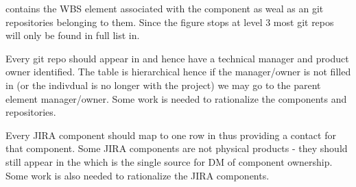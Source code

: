  contains the WBS element associated with the component as weal as an git repositories belonging to them.
 Since the figure stops at level 3 most git repos will only be found in full list in.

 Every git repo should appear in   and hence have a technical manager and product owner identified. The table is hierarchical hence if the manager/owner is not filled in (or the indivdual is no longer with the project) we may go to the parent element manager/owner. Some work is needed to rationalize the components and repositories.

 Every JIRA component should map to one row in  thus providing a contact for that component.
 Some JIRA components are not physical products - they should still appear in the  which is the single source for DM of component  ownership. Some work is also needed to rationalize the JIRA components.
